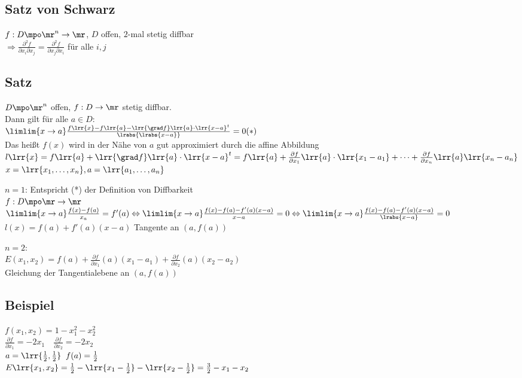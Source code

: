 \subsection{Satz von Schwarz}
	$f:D\mpo\mr^n\rightarrow\mr$, $D$ offen, $2$-mal stetig diffbar\\
	$\Rightarrow \frac{\partial^2 f}{\partial x_i\partial x_j}=\frac{\partial^2 f}{\partial x_j\partial x_i}$ für alle $i,j$

\subsection{Satz}
	$D\mpo\mr^n$ offen, $f:D\rightarrow\mr$ stetig diffbar.\\
	Dann gilt für alle $a\in D$:\\
	$\limlim{x\rightarrow a} \frac{f\lrr{x}-f\lrr{a}-\lrr{\grad f}\lrr{a}\cdot\lrr{x-a}^t}{\lrabs{\lrabs{x-a}}}=0 (*)$\\
	Das heißt $f(x)$ wird in der Nähe von $a$ gut approximiert durch die affine Abbildung\\
	$l\lrr{x}=f\lrr{a}+\lrr{\grad f}\lrr{a}\cdot\lrr{x-a}^t=f\lrr{a}+\frac{\partial f}{\partial x_1}\lrr{a}\cdot\lrr{x_1-a_1}+\dots+\frac{\partial f}{\partial x_n}\lrr{a}\lrr{x_n-a_n}$\\
	$x=\lrr{x_1,\dots,x_n}, a=\lrr{a_1,\dots,a_n}$

	$n=1$: Entspricht (*) der Definition von Diffbarkeit\\
	$f:D\mpo\mr\rightarrow\mr$\\
	$\limlim{x\rightarrow a}\frac{f(x)-f(a)}{x_a} = f'(a)\Leftrightarrow\limlim{x\rightarrow a}\frac{f(x)-f(a)-f'(a)(x-a)}{x-a}=0 \Leftrightarrow\limlim{x\rightarrow a}\frac{f(x)-f(a)-f'(a)(x-a)}{\lrabs{x-a}}=0$\\
	$l(x)=f(a)+f'(a)(x-a)$ Tangente an $(a,f(a))$

	$n=2$:\\
	$E(x_1,x_2)=f(a)+\frac{\partial f}{\partial x_1}(a)(x_1-a_1)+\frac{\partial f}{\partial x_2}(a)(x_2-a_2)$\\
	Gleichung der Tangentialebene an $(a,f(a))$

\subsection{Beispiel}
	$f(x_1,x_2)=1-x_1^2-x_2^2$\\
	$\frac{\partial f}{\partial x_1} = -2x_1\quad\frac{\partial f}{\partial x_2}=-2x_2$\\
	$a=\lrr{\frac{1}{2},\frac{1}{2}}\;\; f(a)=\frac{1}{2}$\\
	$E\lrr{x_1,x_2}=\frac{1}{2} - \lrr{x_1-\frac{1}{2}}-\lrr{x_2-\frac{1}{2}}=\frac{3}{2}-x_1-x_2$

